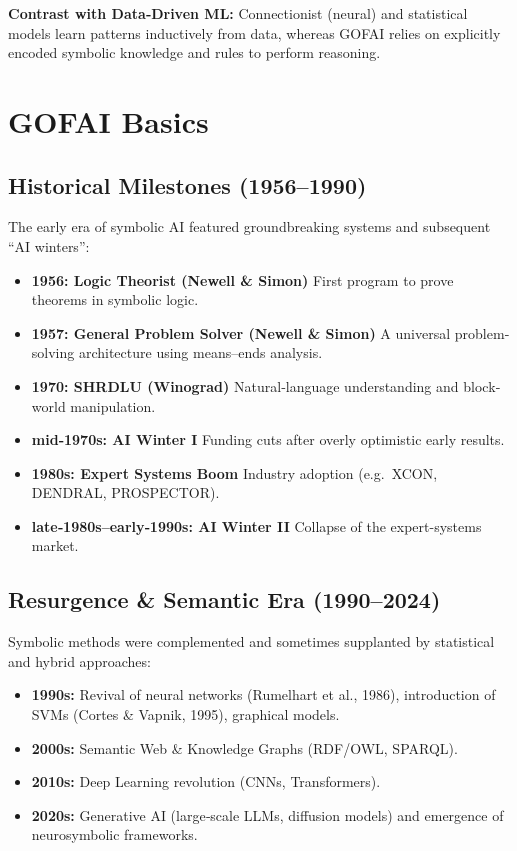 \documentclass[12pt]{article}
\begin{document}
\colorbox{yellow!10}{%
  \parbox{\textwidth}{%
    \textbf{Contrast with Data‐Driven ML:} Connectionist (neural) and statistical models learn patterns inductively from data, whereas GOFAI relies on explicitly encoded symbolic knowledge and rules to perform reasoning.%
  }%
}

\section{GOFAI Basics}

\subsection{Historical Milestones (1956–1990)}

The early era of symbolic AI featured groundbreaking systems and subsequent “AI winters”:

\begin{itemize}
  \item \textbf{1956: Logic Theorist (Newell \& Simon)}  
    First program to prove theorems in symbolic logic.
  \item \textbf{1957: General Problem Solver (Newell \& Simon)}  
    A universal problem‐solving architecture using means–ends analysis.
  \item \textbf{1970: SHRDLU (Winograd)}  
    Natural‐language understanding and block‐world manipulation.
  \item \textbf{mid‐1970s: AI Winter I}  
    Funding cuts after overly optimistic early results.
  \item \textbf{1980s: Expert Systems Boom}  
    Industry adoption (e.g.\ XCON, DENDRAL, PROSPECTOR).
  \item \textbf{late‐1980s–early‐1990s: AI Winter II}  
    Collapse of the expert-systems market.
\end{itemize}

\subsection{Resurgence \& Semantic Era (1990–2024)}

Symbolic methods were complemented and sometimes supplanted by statistical and hybrid approaches:

\begin{itemize}
  \item \textbf{1990s:} Revival of neural networks (Rumelhart et al., 1986), introduction of SVMs (Cortes \& Vapnik, 1995), graphical models.
  \item \textbf{2000s:} Semantic Web \& Knowledge Graphs (RDF/OWL, SPARQL).
  \item \textbf{2010s:} Deep Learning revolution (CNNs, Transformers).
  \item \textbf{2020s:} Generative AI (large‐scale LLMs, diffusion models) and emergence of neurosymbolic frameworks.
\end{itemize}
\end{document}

